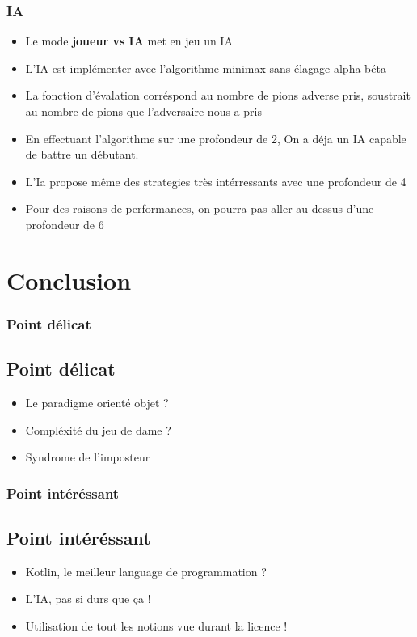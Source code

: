 \documentclass{beamer}
\begin{document}
\begin{frame}
  \frametitle{IA}

  \begin{itemize}
    \item Le mode \textbf{joueur vs IA} met en jeu un IA 
    \item L'IA est implémenter avec l'algorithme minimax sans élagage alpha béta
    \item La fonction d'évalation corréspond au nombre de pions adverse pris, 
    soustrait au nombre de pions que l'adversaire nous a pris
    \item En effectuant l'algorithme sur une profondeur de 2,
    On a déja un IA capable de battre un débutant.
    \item L'Ia propose même des strategies très intérressants avec une profondeur de 4
    \item Pour des raisons de performances, 
    on pourra pas aller au dessus d'une profondeur de 6
  \end{itemize}

\end{frame}
%
%
\section{Conclusion}

\begin{frame}
  \frametitle{Point délicat}
  \subsection{Point délicat}
  \begin{itemize}
    \item Le paradigme orienté objet ?
    \item Compléxité du jeu de dame ?
    \item Syndrome de l'imposteur
  \end{itemize}

\end{frame}

\begin{frame}
  \frametitle{Point intéréssant}
  \subsection{Point intéréssant}
  \begin{itemize}
    \item Kotlin, le meilleur language de programmation ?
    \item L'IA, pas si durs que ça !
    \item Utilisation de tout les notions vue durant la licence !
  \end{itemize}

\end{frame}
\end{document}
